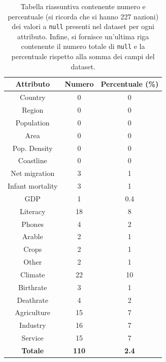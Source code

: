 \begin{table}
	\caption{Tabella riassuntiva contenente numero e percentuale (si ricorda che si hanno 227 nazioni) dei valori a \texttt{null} presenti nel dataset per ogni attributo. Infine, si fornisce un'ultima riga contenente il numero totale di \texttt{null} e la percentuale rispetto alla somma dei campi del dataset.}
	
	\label{tab:compl_country}
	
	\centering
	\begin{tabular}{|c|c|c|}
		\hline
		\textbf{Attributo}  & \textbf{Numero} & \textbf{Percentuale (\%)} \\ 
		\hline  
		\rule{0pt}{13pt}Country & 0 & 0 \\ 
		\hline  
		\rule{0pt}{13pt}Region & 0  & 0 \\ 
		\hline  
		\rule{0pt}{13pt}Population & 0 & 0 \\ 
		\hline  
		\rule{0pt}{13pt}Area & 0 & 0 \\ 
		\hline
		\rule{0pt}{13pt}Pop. Density & 0 & 0 \\
		\hline
		\rule{0pt}{13pt}Coastline & 0 & 0 \\
		\hline
		\rule{0pt}{13pt}Net migration & 3 & 1 \\
		\hline
		\rule{0pt}{13pt}Infant mortality & 3 & 1 \\
		\hline
		\rule{0pt}{13pt}GDP & 1 & 0.4 \\
		\hline
		\rule{0pt}{13pt}Literacy & 18 & 8 \\
		\hline
		\rule{0pt}{13pt}Phones & 4 & 2 \\
		\hline
		\rule{0pt}{13pt}Arable & 2 & 1 \\
		\hline
		\rule{0pt}{13pt}Crops & 2 & 1 \\
		\hline
		\rule{0pt}{13pt}Other & 2 & 1 \\
		\hline
		\rule{0pt}{13pt}Climate & 22 & 10 \\
		\hline
		\rule{0pt}{13pt}Birthrate & 3 & 1 \\
		\hline
		\rule{0pt}{13pt}Deathrate & 4 & 2 \\
		\hline
		\rule{0pt}{13pt}Agriculture & 15 & 7 \\
		\hline
		\rule{0pt}{13pt}Industry & 16 & 7 \\
		\hline
		\rule{0pt}{13pt}Service & 15 & 7 \\
		\hline   
		\rule{0pt}{13pt}\textbf{Totale} & \textbf{110} & \textbf{2.4} \\
		\hline
	\end{tabular}
\end{table}

